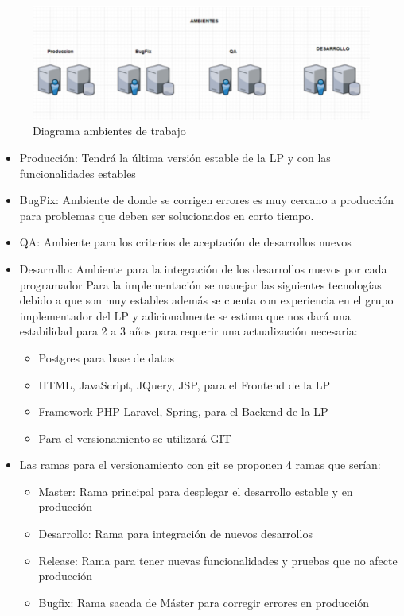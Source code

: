 \documentclass[10pt,a4paper,openany]{book}
\begin{document}
\begin{figure}[h]
	\centering
	\includegraphics[width=1\textwidth]{img1}
	\caption{Diagrama ambientes de trabajo}
	\label{fig:img1}
\end{figure}

\begin{itemize}
	\item Producción: Tendrá la última versión estable de la LP y con las funcionalidades estables
	\item BugFix: Ambiente de donde se corrigen errores es muy cercano a producción para problemas que deben ser solucionados en corto tiempo.
	\item QA: Ambiente para los criterios de aceptación de desarrollos nuevos 
	\item Desarrollo: Ambiente para la integración de los desarrollos nuevos por cada programador
Para la implementación se manejar las siguientes tecnologías debido a que son muy estables además se cuenta con experiencia en el grupo implementador del LP y adicionalmente se estima que nos dará una estabilidad para 2 a 3 años para requerir una actualización necesaria:
	\begin{itemize}
		\item Postgres para base de datos
		\item HTML, JavaScript, JQuery, JSP, para el Frontend de la LP
		\item Framework PHP Laravel, Spring, para el Backend de la LP	
		\item Para el versionamiento se utilizará GIT
	\end{itemize}
	\item Las ramas para el versionamiento con git se proponen 4 ramas que serían:
	\begin{itemize}
		\item Master: Rama principal para desplegar el desarrollo estable y en producción
		\item Desarrollo: Rama para integración de nuevos desarrollos
		\item Release: Rama para tener nuevas funcionalidades y pruebas que no afecte producción	
		\item Bugfix: Rama sacada de Máster para corregir errores en producción
	\end{itemize}
\end{itemize}
\end{document}
